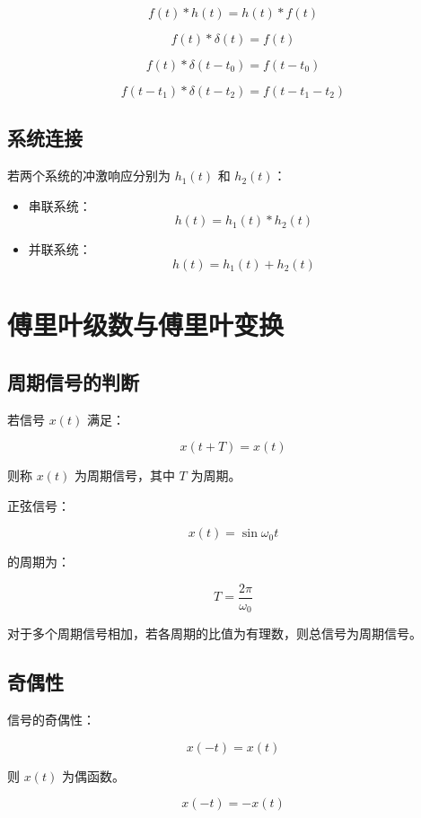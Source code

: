 \documentclass[UTF8]{ctexart}
\begin{document}
\begin{tcolorbox}[colback=blue!5!white,colframe=blue!60!black,title=卷积性质]
\[
f(t)*h(t)=h(t)*f(t)
\]

\[
f(t)*\delta(t)=f(t)
\]

\[
f(t)*\delta(t-t_0)=f(t-t_0)
\]

\[
f(t-t_1)*\delta(t-t_2)=f(t-t_1-t_2)
\]
\end{tcolorbox}

\subsection{系统连接}

若两个系统的冲激响应分别为 $h_1(t)$ 和 $h_2(t)$：

\begin{itemize}
    \item 串联系统：
    \[
    h(t)=h_1(t)*h_2(t)
    \]
    \item 并联系统：
    \[
    h(t)=h_1(t)+h_2(t)
    \]
\end{itemize}

\section{傅里叶级数与傅里叶变换}

\subsection{周期信号的判断}

若信号 $x(t)$ 满足：

\[
x(t+T)=x(t)
\]

则称 $x(t)$ 为周期信号，其中 $T$ 为周期。

正弦信号：

\[
x(t)=\sin \omega_0 t
\]

的周期为：

\[
T=\frac{2\pi}{\omega_0}
\]

对于多个周期信号相加，若各周期的比值为有理数，则总信号为周期信号。

\subsection{奇偶性}

信号的奇偶性：

\[
x(-t)=x(t)
\]

则 $x(t)$ 为偶函数。

\[
x(-t)=-x(t)
\]
\end{document}
